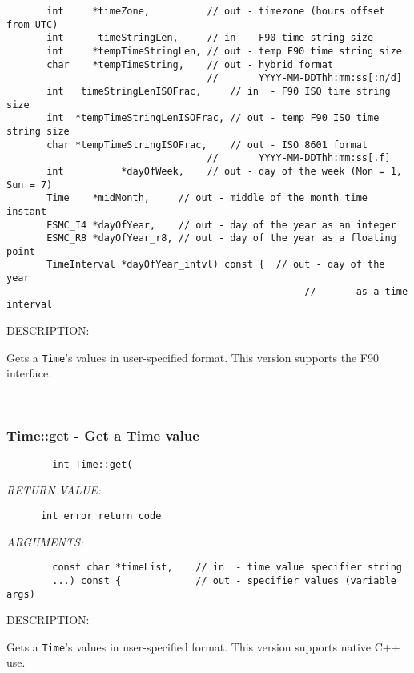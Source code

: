 \begin{verbatim}
       int     *timeZone,          // out - timezone (hours offset from UTC)
       int      timeStringLen,     // in  - F90 time string size
       int     *tempTimeStringLen, // out - temp F90 time string size
       char    *tempTimeString,    // out - hybrid format
                                   //       YYYY-MM-DDThh:mm:ss[:n/d]
       int   timeStringLenISOFrac,     // in  - F90 ISO time string size
       int  *tempTimeStringLenISOFrac, // out - temp F90 ISO time string size
       char *tempTimeStringISOFrac,    // out - ISO 8601 format
                                   //       YYYY-MM-DDThh:mm:ss[.f]
       int          *dayOfWeek,    // out - day of the week (Mon = 1, Sun = 7)
       Time    *midMonth,     // out - middle of the month time instant
       ESMC_I4 *dayOfYear,    // out - day of the year as an integer
       ESMC_R8 *dayOfYear_r8, // out - day of the year as a floating point
       TimeInterval *dayOfYear_intvl) const {  // out - day of the year
                                                    //       as a time interval\end{verbatim}
{\sf DESCRIPTION:\\ }


        Gets a {\tt Time}'s values in user-specified format. This version
        supports the F90 interface.
   
 
\mbox{}\hrulefill\ 
 
\subsubsection [Time::get] {Time::get - Get a Time value}


  
\begin{verbatim}        int Time::get(\end{verbatim}{\em RETURN VALUE:}
\begin{verbatim}      int error return code\end{verbatim}{\em ARGUMENTS:}
\begin{verbatim}        const char *timeList,    // in  - time value specifier string
        ...) const {             // out - specifier values (variable args)\end{verbatim}
{\sf DESCRIPTION:\\ }


        Gets a {\tt Time}'s values in user-specified format. This version
        supports native C++ use.
   
